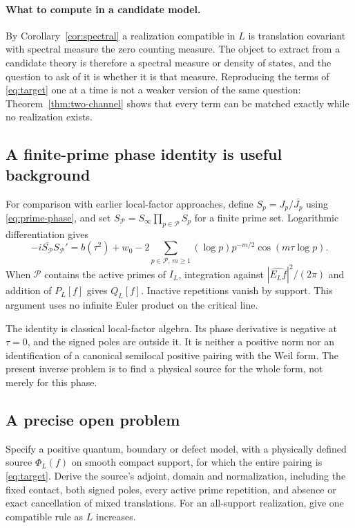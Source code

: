 \paragraph{What to compute in a candidate model.}
By Corollary~\ref{cor:spectral} a realization compatible in $L$ is
translation covariant with spectral measure the zero counting measure. The
object to extract from a candidate theory is therefore a spectral measure or
density of states, and the question to ask of it is whether it is that
measure. Reproducing the terms of \eqref{eq:target} one at a time is not a
weaker version of the same question: Theorem~\ref{thm:two-channel} shows that
every term can be matched exactly while no realization exists.

\subsection{A finite-prime phase identity is useful background}
For comparison with earlier local-factor approaches, define
$S_p=J_p/\overline{J_p}$ using \eqref{eq:prime-phase}, and set
$S_{\mathcal P}=S_\infty\prod_{p\in\mathcal P}S_p$ for a finite prime
set. Logarithmic differentiation gives
\begin{equation}\label{eq:finite-phase}
 -i\overline{S_{\mathcal P}}S_{\mathcal P}'
 =b(\tau^2)+w_0
 -2\sum_{p\in\mathcal P,\,m\geq1}(\log p)p^{-m/2}
                         \cos(m\tau\log p).
\end{equation}
When $\mathcal P$ contains the active primes of $I_L$, integration
against $|\widehat{E_Lf}|^2/(2\pi)$ and addition of $P_L[f]$ gives
$Q_L[f]$. Inactive repetitions vanish by support. This argument uses
no infinite Euler product on the critical line.

The identity is classical local-factor algebra. Its phase derivative
is negative at $\tau=0$, and the signed poles are outside it. It is
neither a positive norm nor an identification of a canonical semilocal
positive pairing with the Weil form. The present inverse problem is
to find a physical source for the whole form, not merely for this phase.

\subsection{A precise open problem}
\begin{problem}\label{prob:joint}
Specify a positive quantum, boundary or defect model, with a physically
defined source $\Phi_L(f)$ on smooth compact support, for which the
entire pairing is \eqref{eq:target}. Derive the source's adjoint,
domain and normalization, including the fixed contact, both signed
poles, every active prime repetition, and absence or exact cancellation
of mixed translations. For an all-support realization, give one
compatible rule as $L$ increases.
\end{problem}

